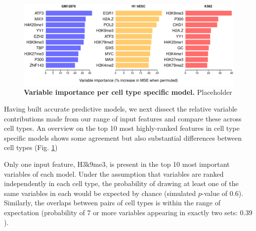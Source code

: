 \documentclass[a4paper,11pt,oneside]{book}
\begin{document}
\begin{figure}
\begin{center} 
\includegraphics[width=\textwidth]{figs/varimp.pdf}
\captionsetup{width=\textwidth} 
\caption{ {\bf Variable importance per cell type specific model. }
Placeholder
}\label{fig:varimp}
\end{center} 
\end{figure} 

Having built accurate predictive models, we next dissect the relative variable contributions made from our range of input features and compare these across cell types. An overview on the top 10 most highly-ranked features in cell type specific models shows some agreement but also substantial differences between cell types (Fig. \ref{fig:varimp})

Only one input feature, H3k9me3, is present in the top 10 most important variables of each model. Under the assumption that variables are ranked independently in each cell type, the probability of drawing at least one of the same variables in each would be expected by chance (simulated $p$-value of $0.6$). Similarly, the overlaps between pairs of cell types is within the range of expectation (probability of 7 or more variables appearing in exactly two sets: $0.39$).
\end{document}
